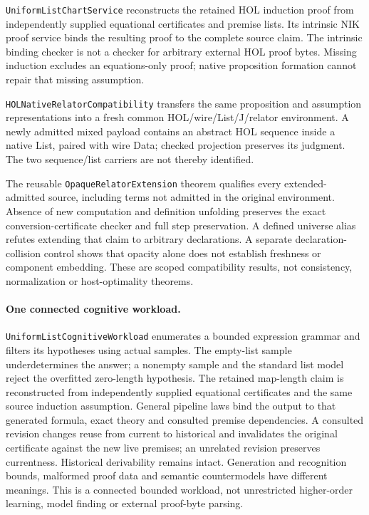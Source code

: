 \documentclass[11pt]{article}
\theoremstyle{definition}
\theoremstyle{remark}
\begin{document}
\texttt{UniformListChartService} reconstructs the retained HOL induction
proof from independently supplied equational certificates and premise lists.
Its intrinsic NIK proof service binds the resulting proof to the complete
source claim. The intrinsic binding checker is not a checker for arbitrary
external HOL proof bytes. Missing induction excludes an equations-only proof;
native proposition formation cannot repair that missing assumption.

\texttt{HOLNativeRelatorCompatibility} transfers the same proposition and
assumption representations into a fresh common HOL/wire/List/J/relator
environment. A newly admitted mixed payload contains an abstract HOL sequence
inside a native List, paired with wire Data; checked projection preserves its
judgment. The two sequence/list carriers are not thereby identified.

The reusable \texttt{OpaqueRelatorExtension} theorem qualifies every
extended-admitted source, including terms not admitted in the original
environment. Absence of new computation and definition unfolding preserves
the exact conversion-certificate checker and full step preservation. A defined
universe alias refutes extending that claim to arbitrary declarations. A
separate declaration-collision control shows that opacity alone does not
establish freshness or component embedding. These are scoped compatibility
results, not consistency, normalization or host-optimality theorems.

\paragraph{One connected cognitive workload.}
\texttt{UniformListCognitiveWorkload} enumerates a bounded expression grammar
and filters its hypotheses using actual samples. The empty-list sample
underdetermines the answer; a nonempty sample and the standard list model
reject the overfitted zero-length hypothesis. The retained map-length claim
is reconstructed from independently supplied equational certificates and
the same source induction assumption. General pipeline laws bind the output
to that generated formula, exact theory and consulted premise dependencies.
A consulted revision changes reuse from current to historical and invalidates
the original certificate against the new live premises; an unrelated revision
preserves currentness. Historical derivability remains intact. Generation
and recognition bounds, malformed proof data and semantic countermodels have
different meanings. This is a connected bounded workload, not unrestricted
higher-order learning, model finding or external proof-byte parsing.
\end{document}
